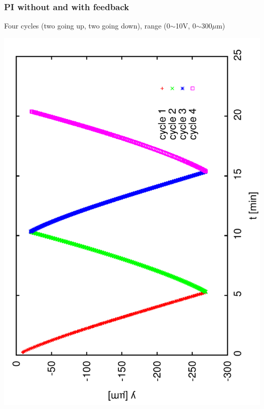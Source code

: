 \documentclass[a4paper,11pt]{book}
\begin{document}
\subsubsection{PI without and with feedback}
Four cycles (two going up, two going down),
range (0$\sim$10V, 0$\sim$300$\mu$m)\par
\includegraphics[angle=-90,scale=0.15]{image11.pdf}
\end{document}

